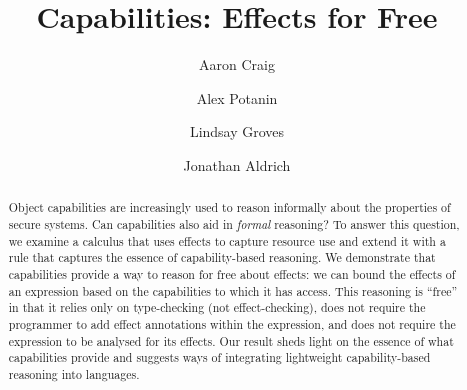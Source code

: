 \documentclass[runningheads]{llncs}
\begin{document}
\title{Capabilities: Effects for Free}

\author{Aaron Craig \and
  Alex Potanin \and
  Lindsay Groves \and
  Jonathan Aldrich}



\maketitle

\begin{abstract}
  Object capabilities are increasingly used to reason informally about
  the properties of secure systems. Can capabilities also aid in
  \textit{formal} reasoning? To answer this question, we examine a
  calculus that uses effects to capture resource use and extend it
  with a rule that captures the essence of capability-based
  reasoning. We demonstrate that capabilities provide a way to reason
  for free about effects: we can bound the effects of an expression
  based on the capabilities to which it has access.  This reasoning is
  ``free'' in that it relies only on type-checking (not
  effect-checking), does not require the programmer to add effect
  annotations within the expression, and does not require the
  expression to be analysed for its effects. Our result sheds light on
  the essence of what capabilities provide and suggests ways of
  integrating lightweight capability-based reasoning into languages.

\end{abstract}






\vspace{-0.5cm}
\end{document}
